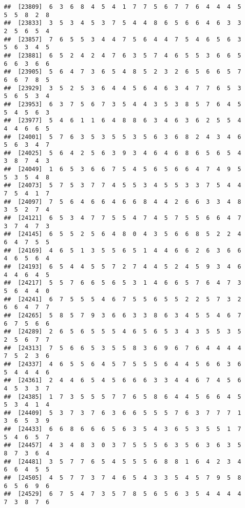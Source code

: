 \documentclass[
]{book}
\begin{document}
\begin{verbatim}
##  [23809]  6  3  6  8  4  5  4  1  7  7  5  6  7  7  6  4  4  4  5  5  5  8  2  8
##  [23833]  3  5  3  4  5  3  7  5  4  4  8  6  5  6  6  4  6  3  3  2  5  6  5  4
##  [23857]  7  6  5  5  3  4  4  7  5  6  4  4  7  5  4  6  5  6  3  5  6  3  4  5
##  [23881]  6  5  2  4  2  4  7  6  3  5  7  4  6  5  5  3  6  6  5  6  6  3  6  6
##  [23905]  5  6  4  7  3  6  5  4  8  5  2  3  2  6  5  6  6  5  7  6  6  7  8  5
##  [23929]  3  5  2  5  3  6  4  4  5  6  4  6  3  4  7  7  6  5  3  5  6  5  3  4
##  [23953]  6  3  7  5  6  7  3  5  4  4  3  5  3  8  5  7  6  4  5  5  4  5  6  3
##  [23977]  5  4  6  1  1  6  4  8  8  6  3  4  6  3  6  2  5  5  4  4  4  6  6  5
##  [24001]  5  7  6  3  5  3  5  5  3  5  6  3  6  8  2  4  3  4  6  5  6  3  4  7
##  [24025]  5  6  4  2  5  6  3  9  3  4  6  4  6  8  6  5  6  5  4  3  8  7  4  3
##  [24049]  1  6  5  3  6  6  7  5  4  5  6  5  6  6  4  7  4  9  5  5  3  5  4  8
##  [24073]  5  7  5  3  7  7  4  5  5  3  4  5  5  3  3  7  5  4  4  7  5  4  1  7
##  [24097]  7  5  6  4  6  6  4  6  6  8  4  4  2  6  6  3  3  4  8  3  5  2  7  4
##  [24121]  6  5  3  4  7  7  5  5  4  7  4  5  7  5  5  6  6  4  7  3  7  4  7  3
##  [24145]  6  5  5  2  5  6  4  8  0  4  3  5  6  6  8  5  2  2  4  6  4  7  5  5
##  [24169]  4  6  5  1  3  5  5  6  5  1  4  4  6  6  2  6  3  6  6  4  6  5  6  4
##  [24193]  6  5  4  4  5  5  7  2  7  4  4  5  2  4  5  9  3  4  6  4  4  6  4  5
##  [24217]  5  5  7  6  6  5  6  5  3  1  4  6  6  5  7  6  4  7  3  5  6  4  4  0
##  [24241]  6  7  5  5  5  4  6  7  5  5  6  5  5  2  2  5  7  3  2  6  6  4  7  7
##  [24265]  5  8  5  7  9  3  6  6  3  3  8  6  3  4  5  5  4  6  7  6  7  5  6  6
##  [24289]  2  6  5  6  5  5  5  4  6  5  6  5  3  4  3  5  5  3  5  2  5  6  7  7
##  [24313]  7  5  6  6  5  3  5  5  8  3  6  9  6  7  6  4  4  4  4  7  5  2  3  6
##  [24337]  4  6  5  5  6  4  5  7  5  5  5  6  4  4  5  6  6  3  6  5  4  4  4  6
##  [24361]  2  4  4  6  5  4  5  6  6  6  3  3  4  4  6  7  4  5  6  4  5  3  3  7
##  [24385]  1  7  3  5  5  5  7  7  6  5  8  6  4  4  5  6  6  4  5  5  3  4  1  4
##  [24409]  5  3  7  3  7  6  3  6  6  5  5  5  7  6  3  7  7  7  1  3  6  5  3  9
##  [24433]  6  6  8  6  6  6  5  6  3  5  4  3  6  5  3  5  5  1  7  5  4  6  5  7
##  [24457]  4  3  4  8  3  0  3  7  5  5  5  6  3  5  6  3  6  3  5  8  7  3  6  4
##  [24481]  3  5  7  7  6  5  4  5  5  5  6  8  8  1  6  4  2  3  4  6  6  4  5  5
##  [24505]  4  5  7  7  3  7  4  6  5  4  3  3  5  4  5  7  9  5  8  6  5  6  9  6
##  [24529]  6  7  5  4  7  3  5  7  8  5  6  5  6  3  5  4  4  4  4  7  3  8  7  6

\end{verbatim}
\end{document}

